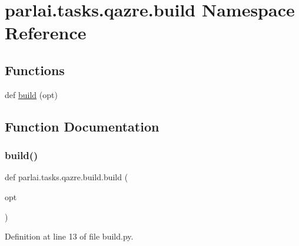 \hypertarget{namespaceparlai_1_1tasks_1_1qazre_1_1build}{}\section{parlai.\+tasks.\+qazre.\+build Namespace Reference}
\label{namespaceparlai_1_1tasks_1_1qazre_1_1build}
\subsection*{Functions}
\begin{DoxyCompactItemize}
\item 
def \hyperlink{namespaceparlai_1_1tasks_1_1qazre_1_1build_a145136e1a407c8a4476fcc949082a74e}{build} (opt)
\end{DoxyCompactItemize}


\subsection{Function Documentation}
\mbox{\label{namespaceparlai_1_1tasks_1_1qazre_1_1build_a145136e1a407c8a4476fcc949082a74e}} 
\subsubsection{\texorpdfstring{build()}{build()}}
{\footnotesize\ttfamily def parlai.\+tasks.\+qazre.\+build.\+build (\begin{DoxyParamCaption}\item[{}]{opt }\end{DoxyParamCaption})}



Definition at line 13 of file build.\+py.


